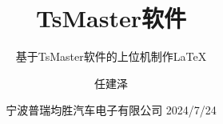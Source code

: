
\title{TsMaster软件\XeLaTeX}
\subtitle{基于TsMaster软件的上位机制作\LaTeX }
\author{任建泽}
\date{宁波普瑞均胜汽车电子有限公司 2024/7/24}









\maketitle
\frontmatter
\tableofcontents
 \mainmatter

\clearpage
{} %
\setcounter{page}{1} %

